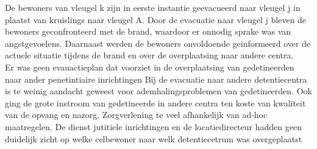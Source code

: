 \documentclass{article}
\begin{document}
	De bewoners van vleugel k zijn in eerste instantie geevacueerd naar vleugel j in plaatst van kruislings naar vleugel A.
	Door de evacuatie naar vleugel j bleven de bewoners geconfronteerd met de brand, waardoor er onnodig sprake was van angstgevoelens. Daarnaast werden de bewoners  onvoldoende geinformeerd over de actuele situatie tijdens de brand en over de overplaatsing naar andere centra. \\
	Er was geen evauactieplan dat voorziet in de overplaatsing van gedetineerden naar ander penetintiaire inrichtingen
	Bij de evacuatie naar andere detentiecentra is te weinig aandacht geweest voor ademhalingsproblemen van gedetineerden.
	Ook ging de grote instroom van gedetineerde in andere centra  ten koste van kwaliteit van de opvang en nazorg.
	Zorgverlening te veel afhankelijk van ad-hoc maatregelen.
	De dienst jutitiele inrichtingen en de locatiedirecteur hadden geen duidelijk zicht op welke celbewoner naar welk detentiecetrum was overgeplaatst
\end{document}
